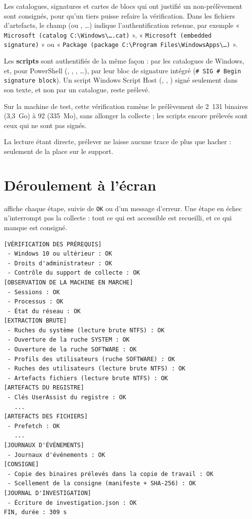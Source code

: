 \documentclass[11pt,a4paper,oneside]{report}
\begin{document}
Les catalogues, signatures et cartes de blocs qui ont justifié un
non-prélèvement sont consignés, pour qu'un tiers puisse refaire la vérification.
Dans les fichiers d'artefacts, le champ  (ou
, \ldots) indique
l'authentification retenue, par exemple
« \texttt{Microsoft (catalog C:\textbackslash{}Windows\textbackslash{}\ldots.cat)} »,
« \texttt{Microsoft (embedded signature)} » ou
« \texttt{Package (package C:\textbackslash{}Program Files\textbackslash{}WindowsApps\textbackslash{}\ldots)} ».

Les \textbf{scripts} sont authentifiés de la même façon : par les catalogues de
Windows, et, pour PowerShell (, , ,
\ldots), par leur bloc de signature intégré
(\texttt{\# SIG \# Begin signature block}). Un script Windows Script Host
(, , ) signé seulement dans son texte, et
non par un catalogue, reste prélevé.

Sur la machine de test, cette vérification ramène le prélèvement de 2~131
binaires (3,3~Go) à 92 (335~Mo), sans allonger la collecte ; les scripts encore
prélevés sont ceux qui ne sont pas signés.

La lecture étant directe, prélever ne laisse aucune trace de plus que hacher :
seulement de la place sur le support.

\section{Déroulement à l'écran}

\wac{} affiche chaque étape, suivie de \texttt{OK} ou d'un message d'erreur. Une
étape en échec n'interrompt pas la collecte : tout ce qui est accessible est
recueilli, et ce qui manque est consigné.

\begin{lstlisting}
[VÉRIFICATION DES PRÉREQUIS]
 - Windows 10 ou ultérieur : OK
 - Droits d'administrateur : OK
 - Contrôle du support de collecte : OK
[OBSERVATION DE LA MACHINE EN MARCHE]
 - Sessions : OK
 - Processus : OK
 - État du réseau : OK
[EXTRACTION BRUTE]
 - Ruches du système (lecture brute NTFS) : OK
 - Ouverture de la ruche SYSTEM : OK
 - Ouverture de la ruche SOFTWARE : OK
 - Profils des utilisateurs (ruche SOFTWARE) : OK
 - Ruches des utilisateurs (lecture brute NTFS) : OK
 - Artefacts fichiers (lecture brute NTFS) : OK
[ARTEFACTS DU REGISTRE]
 - Clés UserAssist du registre : OK
   ...
[ARTEFACTS DES FICHIERS]
 - Prefetch : OK
   ...
[JOURNAUX D'ÉVÉNEMENTS]
 - Journaux d'événements : OK
[CONSIGNE]
 - Copie des binaires prélevés dans la copie de travail : OK
 - Scellement de la consigne (manifeste + SHA-256) : OK
[JOURNAL D'INVESTIGATION]
 - Écriture de investigation.json : OK
FIN, durée : 309 s
\end{lstlisting}
\end{document}
